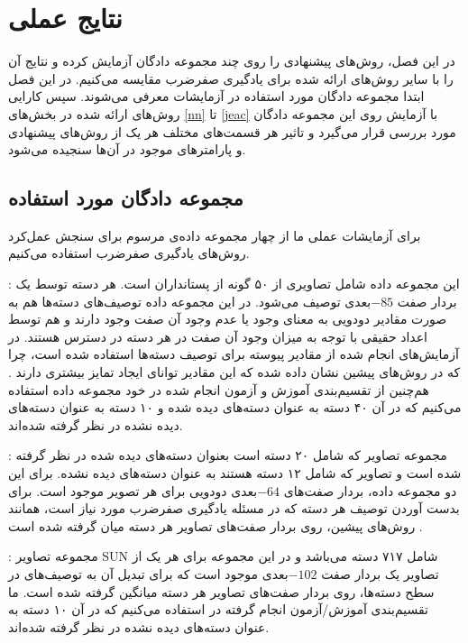\chapter{نتایج عملی} \label{chap:experiments}
در این فصل، روش‌های پیشنهادی را روی چند مجموعه دادگان آزمایش کرده و نتایج آن را با سایر روش‌های ارائه شده برای یادگیری صفرضرب مقایسه می‌کنیم. در این فصل ابتدا مجموعه دادگان مورد استفاده در آزمایشات معرفی می‌شوند. سپس کارایی روش‌های ارائه شده در بخش‌های
\ref{nn}
تا
\ref{jeac}
با آزمایش روی این مجموعه دادگان مورد بررسی قرار می‌گیرد و تاثیر هر قسمت‌های مختلف هر یک از روش‌های پیشنهادی و پارامترهای موجود در آن‌ها سنجیده می‌شود.


\section{مجموعه دادگان مورد استفاده}\label{exp:datasets}
برای آزمایشات عملی ما از چهار مجموعه داده‌ی مرسوم برای سنجش عمل‌کرد روش‌های یادگیری صفرضرب استفاده می‌کنیم.

\textbf{} \cite{lampert09}:
این مجموعه داده شامل تصاویری از ۵۰ گونه از پستانداران است. هر دسته توسط یک بردار صفت $-85$بعدی توصیف می‌شود. در این مجموعه داده توصیف‌های دسته‌ها هم به صورت مقادیر دودویی به معنای وجود یا عدم وجود آن صفت وجود دارند و هم توسط اعداد حقیقی با توجه به میزان وجود آن صفت در هر دسته در دسترس هستند. در آزمایش‌های انجام شده از مقادیر پیوسته برای توصیف دسته‌ها استفاده شده است، چرا که در روش‌های پیشین نشان داده شده که این مقادیر توانای ایجاد تمایز بیشتری دارند \cite{Akata2015}. هم‌چنین از تقسیم‌بندی آموزش و آزمون انجام شده در خود مجموعه داده استفاده می‌کنیم که در آن ۴۰ دسته به عنوان دسته‌های دیده شده و ۱۰ دسته به عنوان
دسته‌های دیده نشده در نظر گرفته شده‌اند.

\textbf{}\cite{farhadi09}:
مجموعه تصاویر
  \cite{pascal}
 که شامل ۲۰ دسته است بعنوان دسته‌های دیده شده در نظر گرفته شده است و تصاویر  که شامل ۱۲ دسته هستند به عنوان دسته‌های دیده نشده. برای این دو مجموعه داده، بردار صفت‌های $-64$بعدی دودویی برای هر تصویر موجود است. برای بدست آوردن توصیف هر دسته که در مسئله یادگیری صفرضرب مورد نیاز است، همانند روش‌های پیشین، روی بردار صفت‌های تصاویر هر دسته میان گرفته
 شده است  \cite{lampert09}.


\textbf{} \cite{sun}:
مجموعه تصاویر SUN شامل ۷۱۷ دسته می‌باشد و در این مجموعه برای هر یک از تصاویر یک بردار صفت $-102$بعدی موجود است که برای تبدیل آن به توصیف‌های در سطح دسته‌ها، روی بردار صفت‌های تصاویر هر دسته میانگین گرفته شده است. ما تقسیم‌بندی آموزش/آزمون انجام گرفته در \cite{jayaraman14} استفاده می‌کنیم که در آن ۱۰ دسته به عنوان دسته‌های دیده نشده در نظر گرفته شده‌اند.


